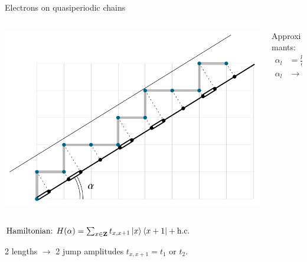 \documentclass[xcolor=x11names,compress,professionalfonts]{beamer}
\renewcommand{\(}{\begin{columns}}
\renewcommand{\)}{\end{columns}}
\newcommand{\<}[1]{\begin{column}{#1}}
\renewcommand{\>}{\end{column}}
\begin{document}
\begin{frame}{Electrons on quasiperiodic chains}
\begin{columns}
\begin{column}{8.5cm}
	\centering
	\includegraphics[scale=.7]{img/cut_and_project.pdf}
\end{column}

\begin{column}{3cm}
Approximants:
\begin{align*}
\alpha_l &= \frac{p_l}{q_l} \\
\alpha_l &\rightarrow \alpha
\end{align*}
\end{column}
\end{columns}

	$
		\text{Hamiltonian: } H(\alpha) = \sum_{x \in \mathbf{Z}} t_{x,x+1} \ket{x} \bra{x+1} + \text{h.c.}
	$
	
	2 lengths $\to$ 2 jump amplitudes $t_{x,x+1} = t_{1}$ or $t_2$.	
\end{frame}
\end{document}
